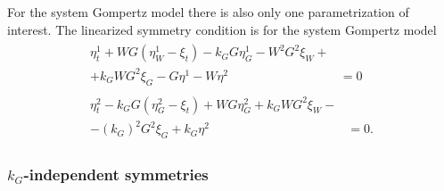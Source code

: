 For the system Gompertz model there is also only one parametrization of interest.
The linearized symmetry condition  is for the system Gompertz model
\begin{subequations}\label{eq:gompertz-system-lin-symmetry-cond}
  \begin{align}
    \begin{split}\label{eq:gompertz-system-lin-symmetry-cond-a}
      \eta^1_t + W G \left(\eta^1_W - \xi_t\right) -k_G G \eta^1_G - W^2 G^2 \xi_W +&\\+ k_G W G^2 \xi_G - G \eta^1 - W \eta^2 &= 0 
    \end{split}\\
    \begin{split}\label{eq:gompertz-system-lin-symmetry-cond-b}
      \eta^2_t - k_G G \left(\eta^2_G - \xi_t\right) + W G \eta^2_G + k_G W G^2 \xi_W -&\\- (k_G)^2 G^2 \xi_G + k_G \eta^2 &= 0. 
    \end{split}
  \end{align}
\end{subequations}

\subsubsection{\texorpdfstring{\(k_G\)-independent symmetries}{Growth rate-independent symmetries}}

